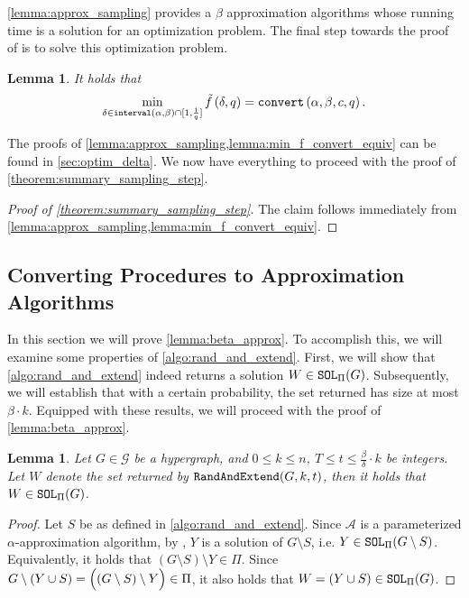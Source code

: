 \documentclass[letterpaper,11pt]{article}
\newcommand{\1}[1]{\mathds{1}\left[#1\right]}
\newcommand{\A}{{\mathcal{A}}}
\newcommand{\runtime}[1][\alpha, \beta, c, q]{\textnormal{\texttt{convert}}\left(#1\right)}
\newcommand{\sat}{\textnormal{\texttt{SOL}}}
\newcommand{\randext}{\textnormal{\texttt{RandAndExtend}}}
\newcommand{\goodd}{\textnormal{\texttt{interval}}(\alpha, \beta)}
\newtheorem{lemma}[theorem]{Lemma}
\begin{document}
\cref{lemma:approx_sampling} provides a $\beta$ approximation algorithms whose running time is a solution for an optimization problem. 
The final step towards the proof of  is to solve this optimization problem.
\begin{lemma}\label{lemma:min_f_convert_equiv}
	It holds that
	\begin{equation*}
		\min_{\delta \in \goodd \cap [1, \frac{1}{q}]}\tilde{f}\,(\delta, q) = \runtime.
	\end{equation*}
\end{lemma}

The proofs of \cref{lemma:approx_sampling,lemma:min_f_convert_equiv} can be found in \cref{sec:optim_delta}.
We now have everything to proceed with the proof of \cref{theorem:summary_sampling_step}.

\begin{proof}[Proof of \cref{theorem:summary_sampling_step}]
	The claim follows immediately from \cref{lemma:approx_sampling,lemma:min_f_convert_equiv}.
\end{proof}

\subsection{Converting Procedures to Approximation Algorithms}
\label{sec:proc_to_approx}
In this section we will prove \cref{lemma:beta_approx}.
To accomplish this, we will examine some properties of \cref{algo:rand_and_extend}.
First, we will show that \cref{algo:rand_and_extend} indeed returns a solution $W \in \sat_{\Pi}(G)$.
Subsequently, we will establish that with a certain probability, the set returned has size at most $\beta \cdot k$.
Equipped with these results, we will proceed with the proof of \cref{lemma:beta_approx}.

\begin{lemma}\label{lem:randext_ret_yes}
	Let $G \in \mathcal{G}$ be a hypergraph, and $0 \leq k \leq n$, $T \leq t \leq \frac{\beta}{\delta} \cdot k$ be integers.
	Let $W$ denote the set returned by $\randext(G,k,t)$, then it holds that $W \in \sat_\Pi(G)$.
\end{lemma}

\begin{proof}
	Let $S$ be as defined in \cref{algo:rand_and_extend}.
	Since $\A$ is a parameterized $\alpha$-approximation
	algorithm, by , $Y$ is a solution of $G \setminus S$,
	i.e. $Y \in \sat_{\Pi}(G \setminus S)$.
	Equivalently, it holds that $\left( G \setminus S \right) \setminus Y \in \Pi$.
	Since $G \setminus \left( Y \cup S \right) = \Bigl(\left( G \setminus S \right) \setminus Y\Bigr) \in \Pi$, it also holds
	that $W = (Y \cup S) \in \sat_{\Pi}(G)$.
\end{proof}
\end{document}

